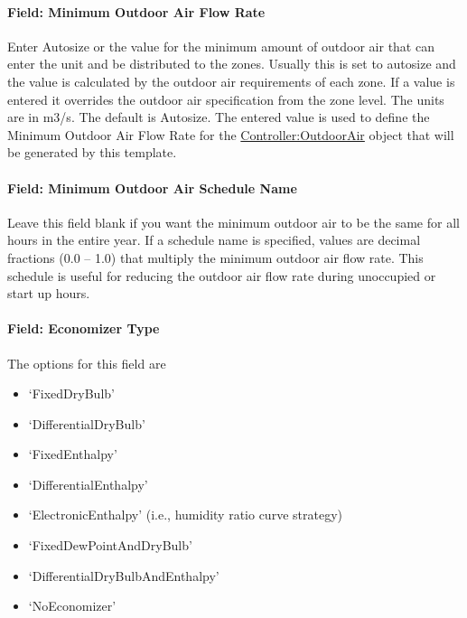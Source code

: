 \paragraph{Field: Minimum Outdoor Air Flow Rate}\label{field-minimum-outdoor-air-flow-rate-2}

Enter Autosize or the value for the minimum amount of outdoor air that can enter the unit and be distributed to the zones. Usually this is set to autosize and the value is calculated by the outdoor air requirements of each zone. If a value is entered it overrides the outdoor air specification from the zone level. The units are in m3/s. The default is Autosize. The entered value is used to define the Minimum Outdoor Air Flow Rate for the \hyperref[controlleroutdoorair]{Controller:OutdoorAir} object that will be generated by this template.

\paragraph{Field: Minimum Outdoor Air Schedule Name}\label{field-minimum-outdoor-air-schedule-name-2}

Leave this field blank if you want the minimum outdoor air to be the same for all hours in the entire year. If a schedule name is specified, values are decimal fractions (0.0 -- 1.0) that multiply the minimum outdoor air flow rate. This schedule is useful for reducing the outdoor air flow rate during unoccupied or start up hours.

\paragraph{Field: Economizer Type}\label{field-economizer-type-2}

The options for this field are

\begin{itemize}
\item
  `FixedDryBulb'
\item
  `DifferentialDryBulb'
\item
  `FixedEnthalpy'
\item
  `DifferentialEnthalpy'
\item
  `ElectronicEnthalpy' (i.e., humidity ratio curve strategy)
\item
  `FixedDewPointAndDryBulb'
\item
  `DifferentialDryBulbAndEnthalpy'
\item
  `NoEconomizer'
\end{itemize}

